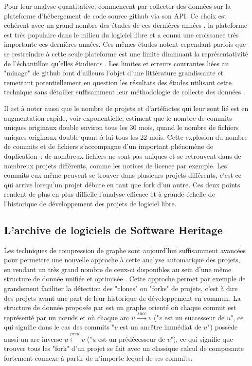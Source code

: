 Pour leur analyse quantitative, \textcite{signals-2019} commencent par collecter des données sur la plateforme
d'hébergement de code source \gls{github} via son \gls{API}. Ce choix est cohérent avec un grand nombre des
études de ces dernières années , la plateforme est très populaire dans le
milieu du logiciel libre et a connu une croissance très importante ces dernières années. Ces mêmes études
notent cependant parfois que se restreindre à cette seule plateforme est une limite diminuant la
représentativité de l'échantillon qu'elles étudients . Les limites et erreurs
courrantes liées au "minage" de \gls{github} font d'ailleurs l'objet d'une littérature grandissante et
remettant potentiellement en question les résultats des études utilisant cette technique sans détailler
suffisamment leur méthodologie de collecte des données \parencites{mining-github-2014}{penumbra-oss-2022}.

Il est à noter aussi que le nombre de projets et d'artéfactes qui leur sont lié est en augmentation rapide,
voir exponentielle,  estiment que le nombre de \glspl{commit} uniques originaux
double environ tous les 30 mois, quand le nombre de fichiers uniques originaux double quant à lui tous les 22
mois. Cette explosion du nombre de \glspl{commit} et de fichiers s'accompagne d'un important phénomène de
duplication : de nombreux fichiers ne sont pas uniques et se retrouvent dans de nombreux projets différents,
comme les notices de licence par exemple. Les \glspl{commit} eux-même peuvent se trouver dans plusieurs
projets différents, c'est ce qui arrive lorsqu'un projet débute en tant que \gls{fork} d'un autre. Ces deux
points rendent de plus en plus difficile l'analyse efficace et à grande échelle de l'historique de
développement des projets de logiciel libre.

\subsection{L'archive de logiciels de Software Heritage}
\label{ssec:swh-graph}

Les techniques de compression de graphe sont aujourd'hui suffisamment avancées pour permettre une nouvelle
approche à cette analyse automatique des projets, en rendant un très grand nombre de ceux-ci disponibles au
sein d'une même structure de donnée unifiée et optimisée . Cette approche permet
par exemple de grandement faciliter la détection des "\glspl{clone}" ou "\glspl{fork}" de projets, c'est à
dire des projets ayant une part de leur historique de développement en commun. La structure de donnée proposée
par \textcite{swh-graph-2020} est un graphe orienté où chaque \gls{commit} est représenté par un nœuds et où
chaque arc $u \xrightarrow{succ} v$ ("$v$ est un successeur de $u$", ce qui signifie dans le cas des
\glspl{commit} "$v$ est un ancêtre immédiat de $u$") possède aussi un arc inverse $u \xleftarrow{pred} v$
("$u$ est un prédécesseur de $v$"), ce qui signifie que trouver tous les "\gls{fork}" d'un projet se fait avec
un classique calcul de composante fortement connexe à partir de n'importe lequel de ses \glspl{commit}.

